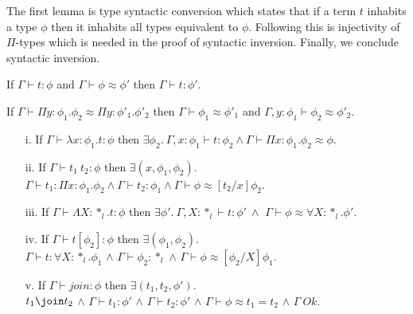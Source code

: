 The first lemma is type syntactic conversion which states that if a
term $t$ inhabits a type $\phi$ then it inhabits all types equivalent
to $\phi$.  Following this is injectivity of $\Pi$-types which is
needed in the proof of syntactic inversion.  Finally, we conclude
syntactic inversion.
\begin{lemma}
  \label{lemma:type_syntactic_conversion_ssfe}
  If $\Gamma \vdash t:\phi$ and $\Gamma \vdash \phi \approx \phi'$ then $\Gamma \vdash t:\phi'$.
\end{lemma}

\begin{lemma}
  \label{lemma:injectivity_of_pi-types_for_type_equality_ssfe}
  If $\Gamma \vdash \Pi y:\phi_1.\phi_2 \approx \Pi y:\phi'_1.\phi'_2$ then
  $\Gamma \vdash \phi_1 \approx \phi'_1$ and $\Gamma,y:\phi_1 \vdash \phi_2 \approx \phi'_2$.
\end{lemma}

\begin{lemma}
  \label{lemma:inversion_ssfe}
  \begin{itemize}\itemsep2pt
  \item[]
  \item[i.] If $\Gamma \vdash \lambda x:\phi_1.t:\phi$
    then $\exists \phi_2.\ \Gamma,x:\phi_1 \vdash t:\phi_2 \land 
    \Gamma \vdash \Pi x:\phi_1.\phi_2 \approx \phi$.

  \item[ii.] If $\Gamma \vdash t_1\ t_2:\phi$ then $\exists (x,\phi_1, \phi_2).$\\
    $\Gamma \vdash t_1:\Pi x:\phi_1.\phi_2 \land
    \Gamma \vdash t_2:\phi_1 \land \Gamma \vdash \phi \approx
     [t_2/x]\phi_2$.

  \item[iii.] If $\Gamma \vdash \Lambda X:*_l.t:\phi$
    then $\exists \phi'.\ \Gamma,X:*_l \vdash t:\phi'\ \land $
    $\Gamma \vdash \phi \approx \forall X:*_l.\phi'$.

  \item[iv.] If $\Gamma \vdash t[\phi_2]:\phi$ then 
    $\exists (\phi_1, \phi_2)$. \\
    $\Gamma \vdash t:\forall X:*_l.\phi_1$ $\land$
    $\Gamma \vdash \phi_2:*_l$ $\land$ 
    $\Gamma \vdash \phi \approx [\phi_2/X]\phi_1$.

  \item[v.] If $\Gamma \vdash join:\phi$ then
    $\exists (t_1,t_2,\phi')$.\\
    $t_1 \join t_2$ $\land$
    $\Gamma \vdash t_1:\phi'$ $\land$
    $\Gamma \vdash t_2:\phi'$ $\land$
    $\Gamma \vdash \phi \approx t_1 = t_2$ $\land$
    $\Gamma\ Ok$.
  \end{itemize}
\end{lemma}

